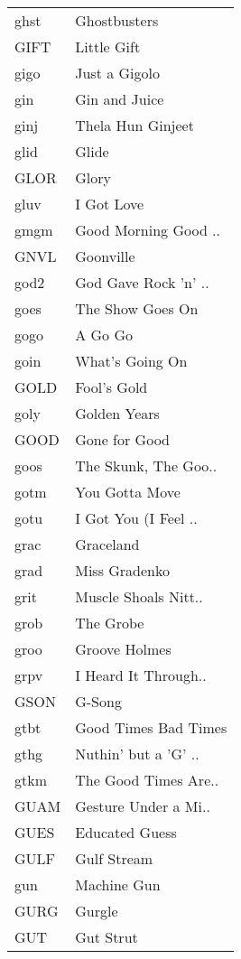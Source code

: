 \begin{supertabular}{ll}
 ghst &          Ghostbusters \\
 GIFT &           Little Gift \\
 gigo &         Just a Gigolo \\
  gin &         Gin and Juice \\
 ginj &     Thela Hun Ginjeet \\
 glid &                 Glide \\
 GLOR &                 Glory \\
 gluv &            I Got Love \\
 gmgm &  Good Morning Good .. \\
 GNVL &             Goonville \\
 god2 &  God Gave Rock 'n' .. \\
 goes &      The Show Goes On \\
 gogo &               A Go Go \\
 goin &       What's Going On \\
 GOLD &           Fool's Gold \\
 goly &          Golden Years \\
 GOOD &         Gone for Good \\
 goos &  The Skunk, The Goo.. \\
 gotm &        You Gotta Move \\
 gotu &  I Got You (I Feel .. \\
 grac &             Graceland \\
 grad &         Miss Gradenko \\
 grit &  Muscle Shoals Nitt.. \\
 grob &             The Grobe \\
 groo &         Groove Holmes \\
 grpv &  I Heard It Through.. \\
 GSON &                G-Song \\
 gtbt &  Good Times Bad Times \\
 gthg &  Nuthin' but a 'G' .. \\
 gtkm &  The Good Times Are.. \\
 GUAM &  Gesture Under a Mi.. \\
 GUES &        Educated Guess \\
 GULF &           Gulf Stream \\
  gun &           Machine Gun \\
 GURG &                Gurgle \\
  GUT &             Gut Strut \\

\end{supertabular}
